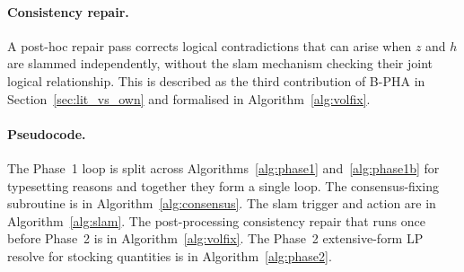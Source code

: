 \documentclass[12pt,a4paper]{article}
\begin{document}
\paragraph{Consistency repair.}
A post-hoc repair pass corrects logical contradictions that can arise
when $z$ and $h$ are slammed independently, without the slam mechanism
checking their joint logical relationship. This is described as the
third contribution of B-PHA in Section~\ref{sec:lit_vs_own} and
formalised in Algorithm~\ref{alg:volfix}.

\paragraph{Pseudocode.}
The Phase~1 loop is split across Algorithms~\ref{alg:phase1}
and~\ref{alg:phase1b} for typesetting reasons and together they form a
single loop. The consensus-fixing subroutine is in
Algorithm~\ref{alg:consensus}. The slam trigger and action are in
Algorithm~\ref{alg:slam}. The post-processing consistency repair that
runs once before Phase~2 is in Algorithm~\ref{alg:volfix}. The
Phase~2 extensive-form LP resolve for stocking quantities is in
Algorithm~\ref{alg:phase2}.
\end{document}
